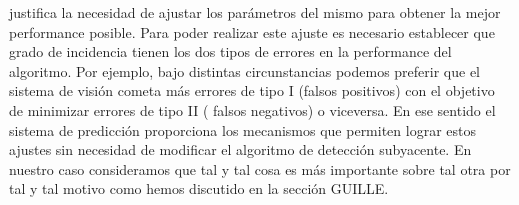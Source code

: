 justifica la necesidad de ajustar los parámetros del mismo para obtener la mejor 
performance posible. Para poder realizar este ajuste es necesario 
establecer que grado de incidencia tienen los dos tipos de errores en la performance del
algoritmo. Por ejemplo, bajo distintas circunstancias podemos preferir que el  
sistema de visión cometa más errores de tipo I (falsos positivos) con 
el objetivo de minimizar errores de tipo II ( falsos negativos) o 
viceversa. En ese sentido el sistema de predicción proporciona los mecanismos que 
permiten lograr estos ajustes sin necesidad de modificar el algoritmo de detección 
subyacente. En nuestro caso consideramos que tal y tal cosa es más 
importante sobre tal otra por tal y tal motivo como hemos discutido en 
la sección GUILLE.
 

